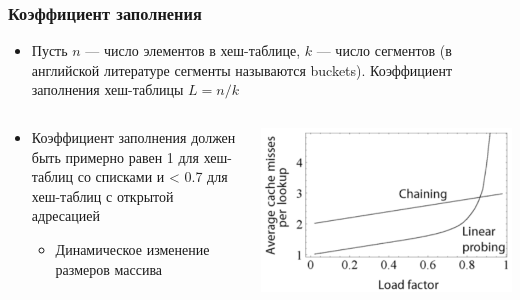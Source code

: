 \documentclass[xetex,mathserif,serif]{beamer}
\begin{document}
	\begin{frame}
		\frametitle{Коэффициент заполнения}
		\begin{itemize}
			\item Пусть $n$ --- число элементов в хеш-таблице, $k$ --- число сегментов (в английской литературе сегменты называются buckets). Коэффициент заполнения хеш-таблицы $L = n / k$
		\end{itemize}
		\begin{columns}
			\begin{column}{0.6\textwidth}
				\begin{itemize}
					\item Коэффициент заполнения должен быть примерно равен 1 для хеш-таблиц со списками и < 0.7 для хеш-таблиц с открытой адресацией
					\begin{itemize}
						\item Динамическое изменение размеров массива
					\end{itemize}
				\end{itemize}
			\end{column}
			\begin{column}{0.4\textwidth}
				\begin{center}
					\includegraphics[width=\textwidth]{loadFactor.png}
				\end{center}
			\end{column}
		\end{columns}
	\end{frame}
\end{document}
